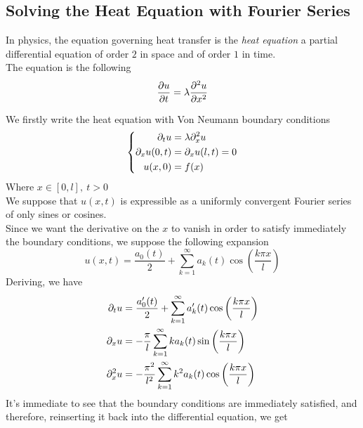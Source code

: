 \documentclass[../complete.tex]{subfiles}
\begin{document}
\subsection{Solving the Heat Equation with Fourier Series}
\begin{dfn}
	In physics, the equation governing heat transfer is the \textit{heat equation} a partial differential equation of order $2$ in space and of order $1$ in time.\\
	The equation is the following
	\begin{equation}
		\pdv{u}{t}=\lambda\pdv[2]{u}{x}
		\label{eq:heateq}
	\end{equation}
\end{dfn}
\begin{eg}
	We firstly write the heat equation with Von Neumann boundary conditions
	\begin{equation}
		\left\{ \begin{aligned}
				\partial_tu&=\lambda\partial^2_xu\\
				\partial_xu(0,t)&=\partial_xu(l,t)=0\\
				u(x,0)&=f(x)
		\end{aligned}\right.
		\label{eq:heateqvonneumann}
	\end{equation}
	Where $x\in[0,l],\ t>0$\\
	We suppose that $u(x,t)$ is expressible as a uniformly convergent Fourier series of only sines or cosines.\\
	Since we want the derivative on the $x$ to vanish in order to satisfy immediately the boundary conditions, we suppose the following expansion
	\begin{equation*}
		u(x,t)=\frac{a_0(t)}{2}+\sum_{k=1}^{\infty}a_k(t)\cos\left( \frac{k\pi x}{l} \right)
	\end{equation*}
	Deriving, we have
	\begin{equation*}
		\begin{aligned}
			\partial_tu&=\frac{a_0'(t)}{2}+\sum_{k=1}^{\infty}a_k'(t)\cos\left( \frac{k\pi x}{l} \right)\\
			\partial_xu&=-\frac{\pi}{l}\sum_{k=1}^\infty ka_k(t)\sin\left( \frac{k\pi x}{l} \right)\\
			\partial^2_xu&=-\frac{\pi^2}{l^2}\sum_{k=1}^{\infty}k^2a_k(t)\cos\left( \frac{k\pi x}{l} \right)
		\end{aligned}
	\end{equation*}
	It's immediate to see that the boundary conditions are immediately satisfied, and therefore, reinserting it back into the differential equation, we get

\end{eg}
\end{document}
